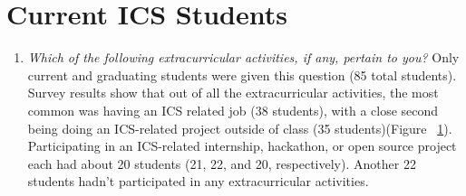 \section{Current ICS Students}
\begin{enumerate}
\begin{figure}[h]
\centering
\texttt{[image: sr-extracurric-bar]}
\caption{Results for extracurricular participation by event type.}
\label{extracurricular}
\end{figure}

\begin{figure}[h]
\centering
\texttt{[image: sr-extracurric-pie]}
\caption{Results for extracurricular participation by amount of participation (all students).}
\label{extracurricular-pie-all}
\end{figure}

\begin{figure}[h]
\centering
\texttt{[image: sr-extracurric-pie-midgrad]}
\caption{Results for extracurricular participation by amount of participation (only students who have completed 5+ ICS courses).}
\label{extracurricular-pie-mid-grad}
\end{figure}
\item \textit{Which of the following extracurricular activities, if any, pertain to you?}
Only current and graduating students were given this question (85 total students). Survey results show that out of all the extracurricular activities, the most common was having an ICS related job (38 students), with a close second being doing an ICS-related project outside of class (35 students)(Figure ~\ref{extracurricular}). Participating in an ICS-related internship, hackathon, or open source project each had about 20 students (21, 22, and 20, respectively). Another 22 students hadn't participated in any extracurricular activities. 


\end{enumerate}
